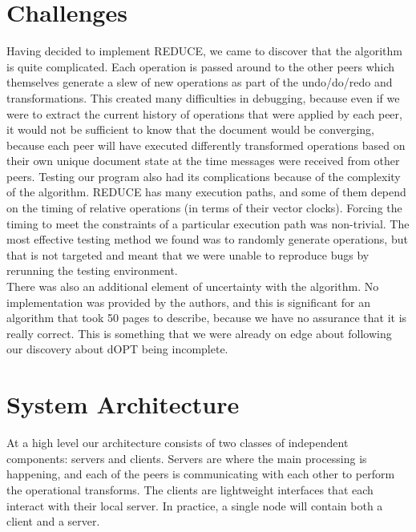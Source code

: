 \documentclass{article}
\begin{document}
\section{Challenges}
Having decided to implement REDUCE, we came to discover that the algorithm is quite complicated. Each operation is passed around to the other peers which themselves generate a slew of new operations as part of the undo/do/redo and transformations. This created many difficulties in debugging, because even if we were to extract the current history of operations that were applied by each peer, it would not be sufficient to know that the document would be converging, because each peer will have executed differently transformed operations based on their own unique document state at the time messages were received from other peers. Testing our program also had its complications because of the complexity of the algorithm. REDUCE has many execution paths, and some of them depend on the timing of relative operations (in terms of their vector clocks). Forcing the timing to meet the constraints of a particular execution path was non-trivial. The most effective testing method we found was to randomly generate operations, but that is not targeted and meant that we were unable to reproduce bugs by rerunning the testing environment.\\

There was also an additional element of uncertainty with the algorithm. No implementation was provided by the authors, and this is significant for an algorithm that took 50 pages to describe, because we have no assurance that it is really correct. This is something that we were already on edge about following our discovery about dOPT being incomplete.\\

\section{System Architecture}
At a high level our architecture consists of two classes of independent components: servers and clients. Servers are where the main processing is happening, and each of the peers is communicating with each other to perform the operational transforms. The clients are lightweight interfaces that each interact with their local server. In practice, a single node will contain both a client and a server.\\
\end{document}
